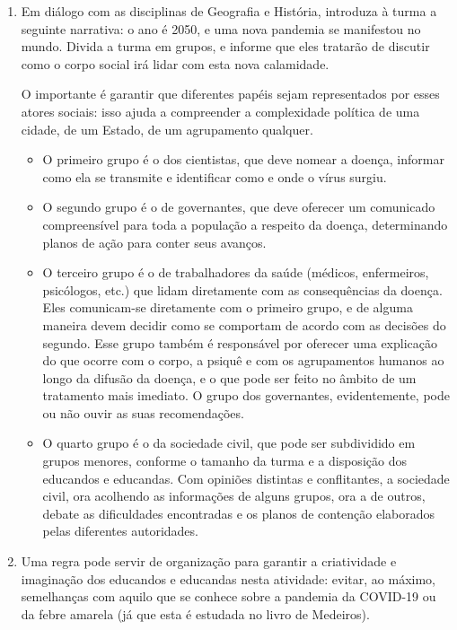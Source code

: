 \documentclass[12pt]{extarticle}
\begin{document}
\begin{enumerate}
\item Em diálogo com as disciplinas de Geografia e História, 
introduza à turma a seguinte narrativa: o ano é 2050, e uma nova pandemia se
manifestou no mundo. Divida a turma em grupos, e informe que eles
tratarão de discutir como o corpo social irá lidar com esta nova
calamidade.

O importante é garantir que diferentes papéis sejam representados por
esses atores sociais: isso ajuda a compreender a complexidade política
de uma cidade, de um Estado, de um agrupamento qualquer.

\begin{itemize}
\item O primeiro grupo é o dos cientistas, que deve nomear a doença, informar
como ela se transmite e identificar como e onde o vírus surgiu.

\item O segundo grupo é o de governantes, que deve oferecer um comunicado
compreensível para toda a população a respeito da doença, determinando
planos de ação para conter seus avanços.

\item O terceiro grupo é o de trabalhadores da saúde (médicos, enfermeiros,
psicólogos, etc.) que lidam diretamente com as consequências da doença.
Eles comunicam-se diretamente com o primeiro grupo, e de alguma maneira
devem decidir como se comportam de acordo com as decisões do segundo.
Esse grupo também é responsável por oferecer uma explicação do que
ocorre com o corpo, a psiquê e com os agrupamentos humanos ao longo da
difusão da doença, e o que pode ser feito no âmbito de um tratamento
mais imediato. O grupo dos governantes, evidentemente, pode ou não ouvir
as suas recomendações.

\item O quarto grupo é o da sociedade civil, que pode ser subdividido em
grupos menores, conforme o tamanho da turma e a disposição dos educandos
e educandas. Com opiniões distintas e conflitantes, a sociedade civil,
ora acolhendo as informações de alguns grupos, ora a de outros, debate
as dificuldades encontradas e os planos de contenção elaborados pelas
diferentes autoridades.
\end{itemize}

\item Uma regra pode servir de organização para garantir a criatividade e
imaginação dos educandos e educandas nesta atividade: evitar, ao máximo,
semelhanças com aquilo que se conhece sobre a pandemia da COVID-19 ou da
febre amarela (já que esta é estudada no livro de Medeiros).


\end{enumerate}
\end{document}
